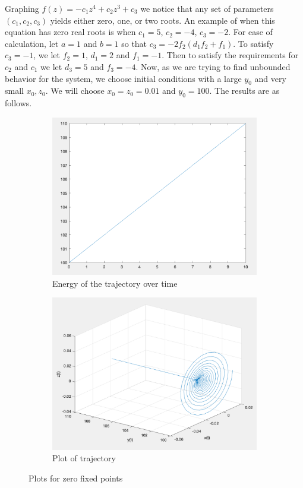 \documentclass[11pt]{article}
\begin{document}
Graphing $f(z) = -c_1z^4 + c_2z^3 + c_3$ we notice that any set of parameters $(c_1, c_2, c_3)$ yields either zero, one, or two roots. An example of when this equation has zero real roots is when $c_1 = 5$, $c_2 = -4$, $c_3 = -2$. For ease of calculation, let $a = 1$ and $b = 1$ so that $c_3 = -2f_2(d_1f_2 + f_1)$. To satisfy $c_3 = -1$, we let $f_2 = 1$, $d_1 = 2$ and $f_1 = -1$. Then to satisfy the requirements for $c_2$ and $c_1$ we let $d_3 = 5$ and $f_3 = -4$. Now, as we are trying to find unbounded behavior for the system, we choose initial conditions with a large $y_0$ and very small $x_0, z_0$. We will choose $x_0 = z_0 = 0.01$ and $y_0 = 100$. The results are as follows. 
\begin{figure}[h!]
\centering
\begin{subfigure}{.5\textwidth}
  \centering
  \includegraphics[width=0.9\linewidth]{energy1.png}
  \caption{Energy of the trajectory over time}
  \label{fig:sub1}
\end{subfigure}%
\begin{subfigure}{.5\textwidth}
  \centering
  \includegraphics[width=0.924\linewidth]{plot1.png}
  \caption{Plot of trajectory}
  \label{fig:sub2}
\end{subfigure}
\caption{Plots for zero fixed points}
\label{fig:test}
\end{figure}
\end{document}
